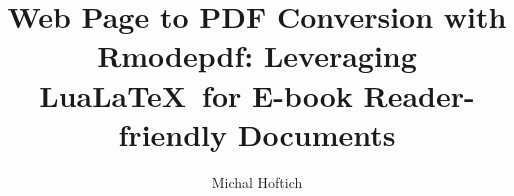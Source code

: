 \author{Michal Hoftich}
\title{Web Page to PDF Conversion with Rmodepdf: Leveraging Lua\LaTeX\ for E-book Reader-friendly Documents}

